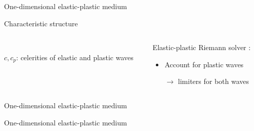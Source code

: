 \begin{frame}{One-dimensional elastic-plastic medium}
\begin{block}{\footnotesize Characteristic structure \cite{Wang}}
\begin{columns}
\begin{column}{0.49\textwidth}
\begin{tikzpicture}[scale=0.6]
        \end{tikzpicture}\\
        \footnotesize $c,c_p$: celerities of elastic and plastic waves
      \end{column}
      \begin{column}{0.49\textwidth}
        \begin{block}{}
          \vspace{-0.95cm}
          \footnotesize Elastic-plastic Riemann solver \cite{Fogarty,Thomas_EP}:
          \begin{footnotesize}
            \begin{itemize}
            \item Account for \alert{plastic waves} 
            \item[$\rightarrow$] limiters for both waves
            \end{itemize}
          \end{footnotesize}
        \end{block}
      \end{column}
    \end{columns}
  \end{block}
  \vspace{-0.2cm}
\end{frame}

\begin{frame}{One-dimensional elastic-plastic medium \cite{Thomas_EP}}
  \centering
\end{frame}


\begin{frame}{}
  \begin{block}{One-dimensional elastic-plastic medium \cite{Thomas_EP}}
  \end{block}
  \begin{overprint}
    \centering
    
    \centering
    
    
    \centering
    
      
  \end{overprint}
  \vspace{-0.1cm}
\end{frame}



